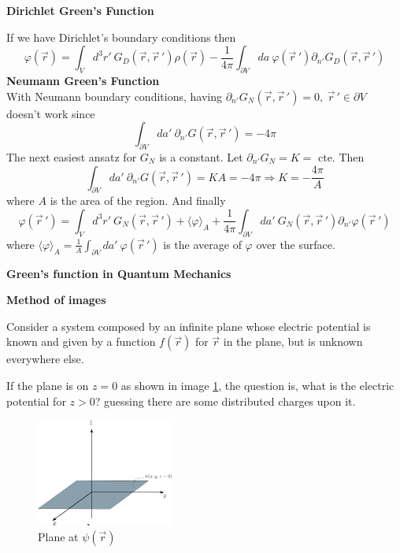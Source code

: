 \documentclass[12pt,a4paper]{article}
\newcommand{\integral}[3]{\int_{#1}^{#2} d #3 \ } %
\begin{document}
\textbf{Dirichlet Green's Function}

If we have Dirichlet's boundary conditions then
\begin{equation}
	\label{PotentialfromDirichletfunction}
	\varphi(\vec{r}) = \integral{V}{}{^3r'}G_D(\vec{r},\vec{r}\,') \rho(\vec{r}) -\frac{1}{4\pi} \integral{\partial V}{}{a}  \varphi(\vec{r}\,')\partial_{n'}G_D(\vec{r},\vec{r}\,')
\end{equation}
\textbf{Neumann Green's Function}\\
With Neumann boundary conditions, having $\partial_{n'} G_N(\vec{r},\vec{r}\,') = 0,\ \vec{r}\,'\in \partial V$ doesn't work since
\begin{equation}
	\integral{\partial V}{}{a'} \partial_{n'}G(\vec{r},\vec{r}\,') = -4\pi
\end{equation}
The next easiest ansatz for $G_N$ is a constant. Let $\partial_{n'} G_N = K = $ cte. Then
\begin{equation}
	\integral{\partial V}{}{a'} \partial_{n'}G(\vec{r},\vec{r}\,') = KA = -4\pi \Rightarrow K = -\frac{4\pi}{A}
\end{equation}
where $A$ is the area of the region. And finally
\begin{equation}
	\varphi(\vec{r}\,') = \integral{V}{}{^3r'} G_N(\vec{r},\vec{r}\,') + \langle \varphi \rangle_A + \frac{1}{4\pi}\integral{\partial V}{}{a'} G_N(\vec{r},\vec{r}\,') \partial_{n'} \varphi(\vec{r}\,')
\end{equation}
where $\langle \varphi \rangle_A = \frac{1}{A}\integral{\partial V}{}{a'} \varphi(\vec{r}\,')$ is the average of $\varphi$ over the surface.

\textbf{Green's function in Quantum Mechanics}

\textbf{Method of images}

Consider a system composed by an infinite plane whose electric potential is known and given by a function $f(\vec{r})$ for $\vec{r}$ in the plane, but is unknown everywhere else.

If the plane is on $z=0$ as shown in image \ref{planeforimagemethod}, the question is, what is the electric potential for $z>0$? guessing there are some distributed charges upon it.

\begin{figure}
	\centering
	\includegraphics[width=0.4\textwidth]{figs/planeforimagemethod.png}
	\caption{Plane at $\psi(\vec{r})$}
	\label{planeforimagemethod}
\end{figure}
\end{document}
